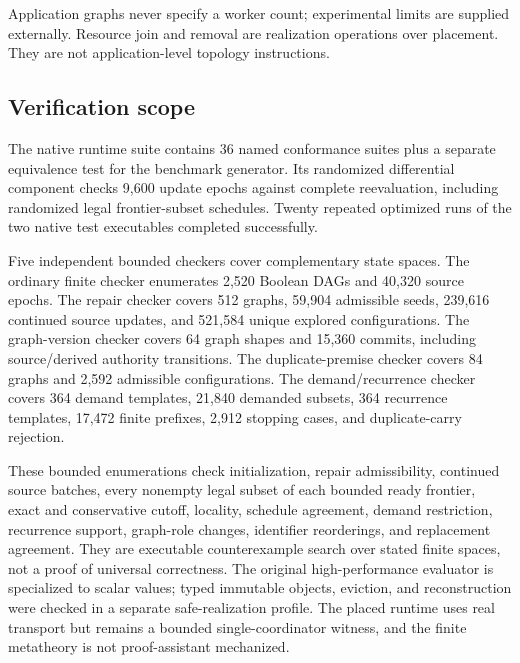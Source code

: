 Application graphs never specify a worker count; experimental limits are supplied externally. Resource join and removal are realization operations over placement. They are not application-level topology instructions.

\subsection{Verification scope}
The native runtime suite contains 36 named conformance suites plus a separate equivalence test for the benchmark generator. Its randomized differential component checks 9,600 update epochs against complete reevaluation, including randomized legal frontier-subset schedules. Twenty repeated optimized runs of the two native test executables completed successfully.

Five independent bounded checkers cover complementary state spaces. The ordinary finite checker enumerates 2,520 Boolean DAGs and 40,320 source epochs. The repair checker covers 512 graphs, 59,904 admissible seeds, 239,616 continued source updates, and 521,584 unique explored configurations. The graph-version checker covers 64 graph shapes and 15,360 commits, including source/derived authority transitions. The duplicate-premise checker covers 84 graphs and 2,592 admissible configurations. The demand/recurrence checker covers 364 demand templates, 21,840 demanded subsets, 364 recurrence templates, 17,472 finite prefixes, 2,912 stopping cases, and duplicate-carry rejection.

These bounded enumerations check initialization, repair admissibility, continued source batches, every nonempty legal subset of each bounded ready frontier, exact and conservative cutoff, locality, schedule agreement, demand restriction, recurrence support, graph-role changes, identifier reorderings, and replacement agreement. They are executable counterexample search over stated finite spaces, not a proof of universal correctness. The original high-performance evaluator is specialized to scalar values; typed immutable objects, eviction, and reconstruction were checked in a separate safe-realization profile. The placed runtime uses real transport but remains a bounded single-coordinator witness, and the finite metatheory is not proof-assistant mechanized.

